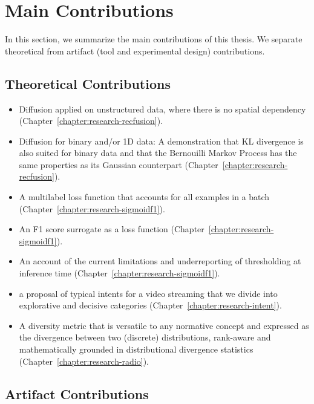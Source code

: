 
\section{Main Contributions}
\label{section:introduction:contributions}

In this section, we summarize the main contributions of this thesis. We separate theoretical from artifact (tool and experimental design) contributions.

\subsection*{Theoretical Contributions}

\begin{itemize}
\item Diffusion applied on unstructured data, where there is no spatial dependency (Chapter~\ref{chapter:research-recfusion}).
\item Diffusion for binary and/or 1D data: A demonstration that KL divergence is also suited for binary data and that the Bernouilli Markov Process has the same properties as its Gaussian counterpart (Chapter~\ref{chapter:research-recfusion}).
\item A multilabel loss function that accounts for all examples in a batch (Chapter~\ref{chapter:research-sigmoidf1}).
\item An F1 score surrogate as a loss function (Chapter~\ref{chapter:research-sigmoidf1}).
\item An account of the current limitations and underreporting of thresholding at inference time (Chapter~\ref{chapter:research-sigmoidf1}).
\item a proposal of typical intents for a video streaming that we divide into explorative and decisive categories (Chapter~\ref{chapter:research-intent}).
\item A diversity metric that is versatile to any normative concept and expressed as the divergence between two (discrete) distributions, rank-aware and mathematically grounded in distributional divergence statistics (Chapter~\ref{chapter:research-radio}).
\end{itemize}

\subsection*{Artifact Contributions}

